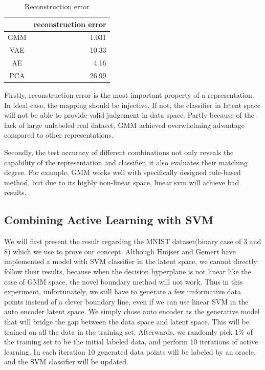 \documentclass[10pt,twocolumn,letterpaper]{article}
\begin{document}
\begin{table}
    \centering
    \caption{Reconstruction error}
      \begin{tabular}{cr}
        \hline
            & \multicolumn{1}{p{12.535em}}{reconstruction error} \\
            \hline
      GMM   & 1.031 \\
      VAE   & 10.33 \\
      AE    & 4.16 \\
      PCA   & 26.99 \\
      \hline
      \end{tabular}%
    \label{tab:addlabel}%
  \end{table}%
  

Firstly, reconstruction error is the most important property of a representation. In ideal case, the mapping should be injective. If not, the classifier in latent space will not be able to provide valid judgement in data space. Partly because of the lack of large unlabeled real dataset, GMM achieved overwhelming advantage compared to other representations.

Secondly, the test accuracy of different combinations not only reveals the capability of the representation and classifier, it also evaluates their matching degree. For example, GMM works well with specifically designed rule-based method, but due to its highly non-linear space, linear svm will achieve bad results.

\subsection{Combining Active Learning with SVM}
We will first present the result regarding the MNIST dataset(binary case of 3 and 8) which we use to prove our concept. Although Huijser and Gemert have implemented a model with SVM classifier in the latent space\cite{huijser2017active}, we cannot directly follow their results, because when the decision hyperplane is not linear like the case of GMM space, the novel boundary method will not work. Thus in this experiment, unfortunately, we still have to generate a few imformative data points instend of a clever boundary line, even if we can use linear SVM in the auto encoder latent space. We simply chose auto encoder as the generative model that will bridge the gap between the data space and latent space. This will be trained on all the data in the training set. Afterwards, we randomly pick $1\%$ of the training set to be the initial labeled data, and perform 10 iterations of active learning. In each iteration 10 generated data points will be labeled by an oracle, and the SVM classifier will be updated.
\end{document}
